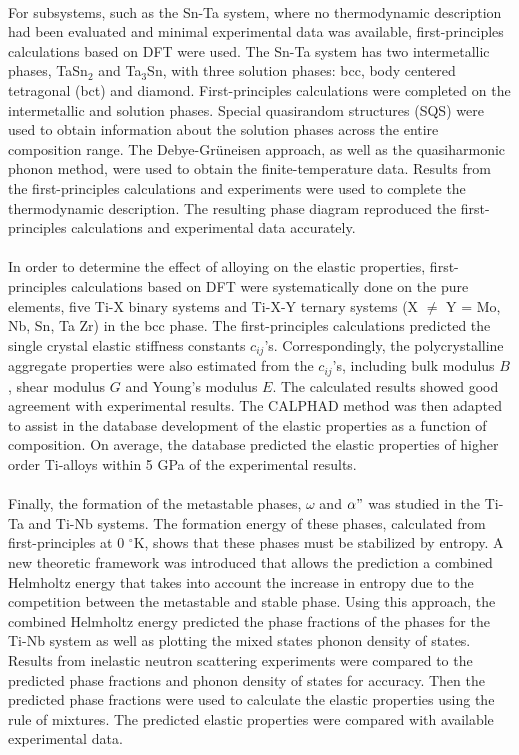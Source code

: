 \paragraph*{} For subsystems, such as the Sn-Ta system, where no thermodynamic description had been evaluated and minimal experimental data was available, first-principles calculations based on DFT were used. The Sn-Ta system has two intermetallic phases, TaSn$_{2}$ and Ta$_{3}$Sn, with three solution phases: bcc, body centered tetragonal (bct) and diamond. First-principles calculations were completed on the intermetallic and solution phases. Special quasirandom structures (SQS) were used to obtain information about the solution phases across the entire composition range. The Debye-Gr\"uneisen approach, as well as the quasiharmonic phonon method, were used to obtain the finite-temperature data. Results from the first-principles calculations and experiments were used to complete the thermodynamic description. The resulting phase diagram reproduced the first-principles calculations and experimental data accurately.
\paragraph*{} In order to determine the effect of alloying on the elastic properties, first-principles calculations based on DFT were systematically done on the pure elements, five Ti-X binary systems and Ti-X-Y ternary systems (X $\neq $ Y = Mo, Nb, Sn, Ta Zr) in the bcc phase. The first-principles calculations predicted the single crystal elastic stiffness constants $c_{ij}$'s. Correspondingly, the polycrystalline aggregate properties were also estimated from the $c_{ij}$'s, including bulk modulus $B$, shear modulus $G$ and Young's modulus $E$. The calculated results showed good agreement with experimental results. The CALPHAD method was then adapted to assist in the database development of the elastic properties as a function of composition. On average, the database predicted the elastic properties of higher order Ti-alloys within 5 GPa of the experimental results.
\paragraph*{} Finally, the formation of the metastable phases, $\omega$ and $\alpha"$ was studied in the Ti-Ta and Ti-Nb systems. The formation energy of these phases, calculated from first-principles at 0 $^\circ$K, shows that these phases must be stabilized by entropy. A new theoretic framework was introduced that allows the prediction a combined Helmholtz energy that takes into account the increase in entropy due to the competition between the metastable and stable phase. Using this approach, the combined Helmholtz energy predicted the phase fractions of the phases for the Ti-Nb system as well as plotting the mixed states phonon density of states. Results from inelastic neutron scattering experiments were compared to the predicted phase fractions and phonon density of states for accuracy. Then the predicted phase fractions were used to calculate the elastic properties using the rule of mixtures. The predicted elastic properties were compared with available experimental data.
